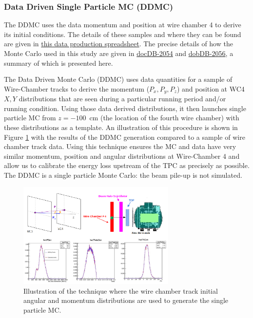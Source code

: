 \subsubsection{Data Driven Single Particle MC (DDMC) }\label{sec:DDMCSamples}
The DDMC uses the data momentum and position at wire chamber 4 to derive its initial conditions. The details of these samples and where they can be found are given in \href{https://docs.google.com/spreadsheets/d/1_0kNCKBIIx53f6vopqN2OijtcTICHD9rDvN_YKGH2mI/edit?usp=sharing}{this data production spreadsheet}.
The precise details of how the Monte Carlo used in this study are given in \href{https://lartpc-docdb.fnal.gov:441/cgi-bin/ShowDocument?docid=2054}{docDB-2054} and  \href{https://lartpc-docdb.fnal.gov:441/cgi-bin/ShowDocument?docid=2056}{dobDB-2056}, a summary of which is presented here. 

The Data Driven Monte Carlo (DDMC) uses data quantities for a sample of Wire-Chamber tracks to derive the momentum ($P_x, P_y, P_z$) and position at WC4 $X, Y$ distributions that are seen during a particular running period and/or running condition. Using those data derived distributions, it then launches single particle MC from $z = -100$~cm (the location of the fourth wire chamber) with these distributions as a template. An illustration of this procedure is shown in Figure \ref{fig:DDMC} with the results of the DDMC generation compared to a sample of wire chamber track data. Using this technique ensures the MC and data have very similar momentum, position and angular distributions at Wire-Chamber 4 and allow us to calibrate the energy loss upstream of the TPC as precisely as possible. The DDMC is a single particle Monte Carlo: the beam pile-up is not simulated.

\begin{figure}[htb]
\centering
\includegraphics[width=0.70\textwidth]{images/DDMC.png}
\caption{Illustration of the technique where the wire chamber track initial angular and momentum distributions are used to generate the single particle MC.}
\label{fig:DDMC}
\end{figure}

